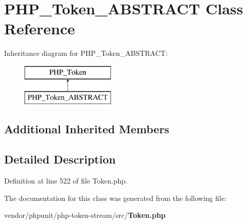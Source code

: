 \section{P\+H\+P\+\_\+\+Token\+\_\+\+A\+B\+S\+T\+R\+A\+C\+T Class Reference}
\label{class_p_h_p___token___a_b_s_t_r_a_c_t}
Inheritance diagram for P\+H\+P\+\_\+\+Token\+\_\+\+A\+B\+S\+T\+R\+A\+C\+T\+:\begin{figure}[H]
\begin{center}
\leavevmode
\includegraphics[height=2.000000cm]{class_p_h_p___token___a_b_s_t_r_a_c_t}
\end{center}
\end{figure}
\subsection*{Additional Inherited Members}


\subsection{Detailed Description}


Definition at line 522 of file Token.\+php.



The documentation for this class was generated from the following file\+:\begin{DoxyCompactItemize}
\item 
vendor/phpunit/php-\/token-\/stream/src/{\bf Token.\+php}\end{DoxyCompactItemize}
